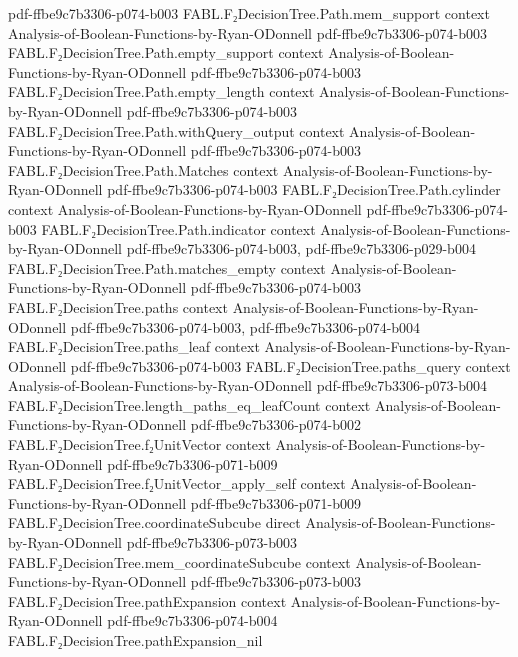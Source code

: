 \begin{theorem}
  {pdf-ffbe9c7b3306-p074-b003}
\proofstep
  {FABL.F₂DecisionTree.Path.mem_support}
  {context}
  {Analysis-of-Boolean-Functions-by-Ryan-ODonnell}
  {pdf-ffbe9c7b3306-p074-b003}
\proofstep
  {FABL.F₂DecisionTree.Path.empty_support}
  {context}
  {Analysis-of-Boolean-Functions-by-Ryan-ODonnell}
  {pdf-ffbe9c7b3306-p074-b003}
\proofstep
  {FABL.F₂DecisionTree.Path.empty_length}
  {context}
  {Analysis-of-Boolean-Functions-by-Ryan-ODonnell}
  {pdf-ffbe9c7b3306-p074-b003}
\proofstep
  {FABL.F₂DecisionTree.Path.withQuery_output}
  {context}
  {Analysis-of-Boolean-Functions-by-Ryan-ODonnell}
  {pdf-ffbe9c7b3306-p074-b003}
\proofstep
  {FABL.F₂DecisionTree.Path.Matches}
  {context}
  {Analysis-of-Boolean-Functions-by-Ryan-ODonnell}
  {pdf-ffbe9c7b3306-p074-b003}
\proofstep
  {FABL.F₂DecisionTree.Path.cylinder}
  {context}
  {Analysis-of-Boolean-Functions-by-Ryan-ODonnell}
  {pdf-ffbe9c7b3306-p074-b003}
\proofstep
  {FABL.F₂DecisionTree.Path.indicator}
  {context}
  {Analysis-of-Boolean-Functions-by-Ryan-ODonnell}
  {pdf-ffbe9c7b3306-p074-b003,
    pdf-ffbe9c7b3306-p029-b004}
\proofstep
  {FABL.F₂DecisionTree.Path.matches_empty}
  {context}
  {Analysis-of-Boolean-Functions-by-Ryan-ODonnell}
  {pdf-ffbe9c7b3306-p074-b003}
\proofstep
  {FABL.F₂DecisionTree.paths}
  {context}
  {Analysis-of-Boolean-Functions-by-Ryan-ODonnell}
  {pdf-ffbe9c7b3306-p074-b003,
    pdf-ffbe9c7b3306-p074-b004}
\proofstep
  {FABL.F₂DecisionTree.paths_leaf}
  {context}
  {Analysis-of-Boolean-Functions-by-Ryan-ODonnell}
  {pdf-ffbe9c7b3306-p074-b003}
\proofstep
  {FABL.F₂DecisionTree.paths_query}
  {context}
  {Analysis-of-Boolean-Functions-by-Ryan-ODonnell}
  {pdf-ffbe9c7b3306-p073-b004}
\proofstep
  {FABL.F₂DecisionTree.length_paths_eq_leafCount}
  {context}
  {Analysis-of-Boolean-Functions-by-Ryan-ODonnell}
  {pdf-ffbe9c7b3306-p074-b002}
\proofstep
  {FABL.F₂DecisionTree.f₂UnitVector}
  {context}
  {Analysis-of-Boolean-Functions-by-Ryan-ODonnell}
  {pdf-ffbe9c7b3306-p071-b009}
\proofstep
  {FABL.F₂DecisionTree.f₂UnitVector_apply_self}
  {context}
  {Analysis-of-Boolean-Functions-by-Ryan-ODonnell}
  {pdf-ffbe9c7b3306-p071-b009}
\proofstep
  {FABL.F₂DecisionTree.coordinateSubcube}
  {direct}
  {Analysis-of-Boolean-Functions-by-Ryan-ODonnell}
  {pdf-ffbe9c7b3306-p073-b003}
\proofstep
  {FABL.F₂DecisionTree.mem_coordinateSubcube}
  {context}
  {Analysis-of-Boolean-Functions-by-Ryan-ODonnell}
  {pdf-ffbe9c7b3306-p073-b003}
\proofstep
  {FABL.F₂DecisionTree.pathExpansion}
  {context}
  {Analysis-of-Boolean-Functions-by-Ryan-ODonnell}
  {pdf-ffbe9c7b3306-p074-b004}
\proofstep
  {FABL.F₂DecisionTree.pathExpansion_nil}

\end{theorem}
